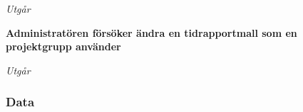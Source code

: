 \documentclass[a4paper]{article}
\begin{document}
\begin{FT}
\emph{Utgår}



\item %
\textbf{Administratören försöker ändra en tidrapportmall som en projektgrupp använder}

\emph{Utgår}



\end{FT}
\subsubsection{Data}
\end{document}
